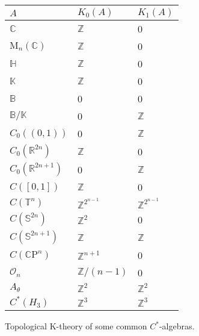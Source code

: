 \documentclass[12pt]{article}
\newcommand*{\Zset}{\mathbb{Z}}
\newcommand*{\Rset}{\mathbb{R}}
\newcommand*{\Cset}{\mathbb{C}}
\newcommand*{\Hset}{\mathbb{H}}
\newcommand*{\Bset}{\mathbb{B}}
\newcommand*{\Kset}{\mathbb{K}}
\newcommand*{\Sset}{\mathbb{S}}
\newcommand*{\Tset}{\mathbb{T}}
\newcommand*{\Matrix}[2]{\mathord{\mathrm{M}_{#1}(#2)}}
\theoremstyle{inlinedefn}
\theoremstyle{break}
\begin{document}
\begin{center}
\begin{tabular}{|l|l|l|}
\hline
$A$ & $K_0(A)$ & $K_1(A)$ \\
\hline
$\Cset$ & $\Zset$ & 0 \\
$\Matrix{n}{\Cset}$ & $\Zset$ & 0 \\
$\Hset$ & $\Zset$ & 0 \\
$\Kset$ & $\Zset$ & 0 \\
$\Bset$ & 0 & 0 \\
$\Bset/\Kset$ & 0 & $\Zset$ \\
$C_0((0,1))$ & 0 & $\Zset$ \\
$C_0(\Rset^{2n})$ & $\Zset$ & 0 \\
$C_0(\Rset^{2n+1})$ & 0 & $\Zset$ \\
$C([0,1])$ & $\Zset$ & 0 \\
$C(\Tset^n)$ & $\Zset^{2^{n-1}}$ & $\Zset^{2^{n-1}}$ \\
$C(\Sset^{2n})$ & $\Zset^2$ & 0 \\
$C(\Sset^{2n+1})$ & $\Zset$ & $\Zset$ \\
$C(\Cset\mathrm{P}^n)$ & $\Zset^{n+1}$ & 0 \\
$\mathcal{O}_n$ & $\Zset/(n-1)$ & 0 \\
$A_\theta$ & $\Zset^2$ & $\Zset^2$ \\
$C^*(H_3)$ & $\Zset^3$ & $\Zset^3$ \\
\hline
\end{tabular}

Topological K-theory of some common $C^*$-algebras.
\end{center}
\end{document}
